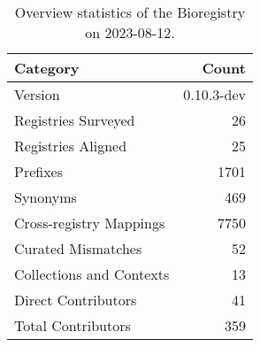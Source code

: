 \begin{table}
\caption{Overview statistics of the Bioregistry on 2023-08-12.}
\label{tab:bioregistry-summary}
\begin{tabular}{lr}
\toprule
Category & Count \\
\midrule
Version & 0.10.3-dev \\
Registries Surveyed & 26 \\
Registries Aligned & 25 \\
Prefixes & 1701 \\
Synonyms & 469 \\
Cross-registry Mappings & 7750 \\
Curated Mismatches & 52 \\
Collections and Contexts & 13 \\
Direct Contributors & 41 \\
Total Contributors & 359 \\
\bottomrule
\end{tabular}
\end{table}
